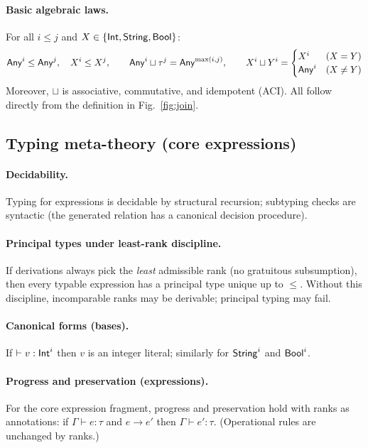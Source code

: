 \paragraph{Basic algebraic laws.}
For all $i\le j$ and $X\in\{\mathsf{Int},\mathsf{String},\mathsf{Bool}\}$:
\[
\mathsf{Any}^{i}\le \mathsf{Any}^{j},\quad X^{i}\le X^{j},\qquad
\mathsf{Any}^{i}\sqcup \tau^{j}= \mathsf{Any}^{\max(i,j)},\qquad
X^{i}\sqcup Y^{i}=
\begin{cases}
X^{i} & (X=Y)\\
\mathsf{Any}^{i} & (X\neq Y)
\end{cases}
\]
Moreover, $\sqcup$ is associative, commutative, and idempotent (ACI).
All follow directly from the definition in Fig.~\ref{fig:join}.

\subsection{Typing meta-theory (core expressions)}

\paragraph{Decidability.}
Typing for expressions is decidable by structural recursion; subtyping checks are syntactic (the generated relation has a canonical decision procedure).

\paragraph{Principal types under least-rank discipline.}
If derivations always pick the \emph{least} admissible rank (no gratuitous subsumption), then every typable expression has a principal type unique up to $\le$.
Without this discipline, incomparable ranks may be derivable; principal typing may fail.

\paragraph{Canonical forms (bases).}
If $\vdash v:\mathsf{Int}^{i}$ then $v$ is an integer literal; similarly for $\mathsf{String}^{i}$ and $\mathsf{Bool}^{i}$.

\paragraph{Progress and preservation (expressions).}
For the core expression fragment, progress and preservation hold with ranks as annotations: if $\Gamma\vdash e:\tau$ and $e\to e'$ then $\Gamma\vdash e':\tau$.
(Operational rules are unchanged by ranks.)

